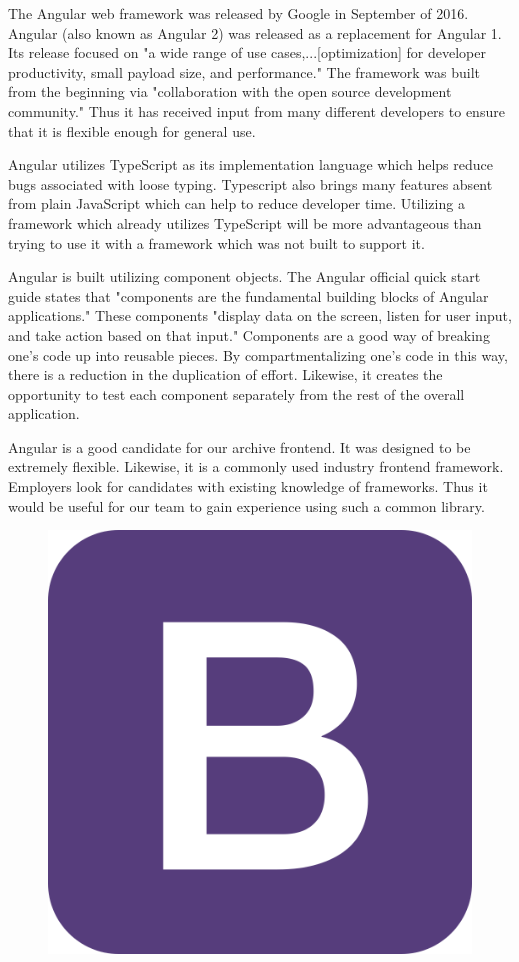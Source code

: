 \documentclass[12pt]{report}
\begin{document}
The Angular web framework was released by Google in September of 2016.\cite{angularrelease} Angular (also known as Angular 2) was released as a replacement for Angular 1. Its release focused on "a wide range of use cases,...[optimization] for developer productivity, small payload size, and performance."\cite{angularrelease} The framework was built from the beginning via "collaboration with the open source development community."\cite{angularrelease} Thus it has received input from many different developers to ensure that it is flexible enough for general use.

Angular utilizes TypeScript as its implementation language which helps reduce bugs associated with loose typing. Typescript also brings many features absent from plain JavaScript which can help to reduce developer time. Utilizing a framework which already utilizes TypeScript will be more advantageous than trying to use it with a framework which was not built to support it.

Angular is built utilizing component objects. The Angular official quick start guide states that "components are the fundamental building blocks of Angular applications."\cite{angularquickstart} These components "display data on the screen, listen for user input, and take action based on that input."\cite{angularquickstart} Components are a good way of breaking one's code up into reusable pieces. By compartmentalizing one's code in this way, there is a reduction in the duplication of effort. Likewise, it creates the opportunity to test each component separately from the rest of the overall application.

Angular is a good candidate for our archive frontend. It was designed to be extremely flexible. Likewise, it is a commonly used industry frontend framework. Employers look for candidates with existing knowledge of frameworks. Thus it would be useful for our team to gain experience using such a common library.

\begin{figure}[h]
	\centering
	\includegraphics[width=0.25\linewidth]{bootstrap}
\end{figure}
\end{document}
